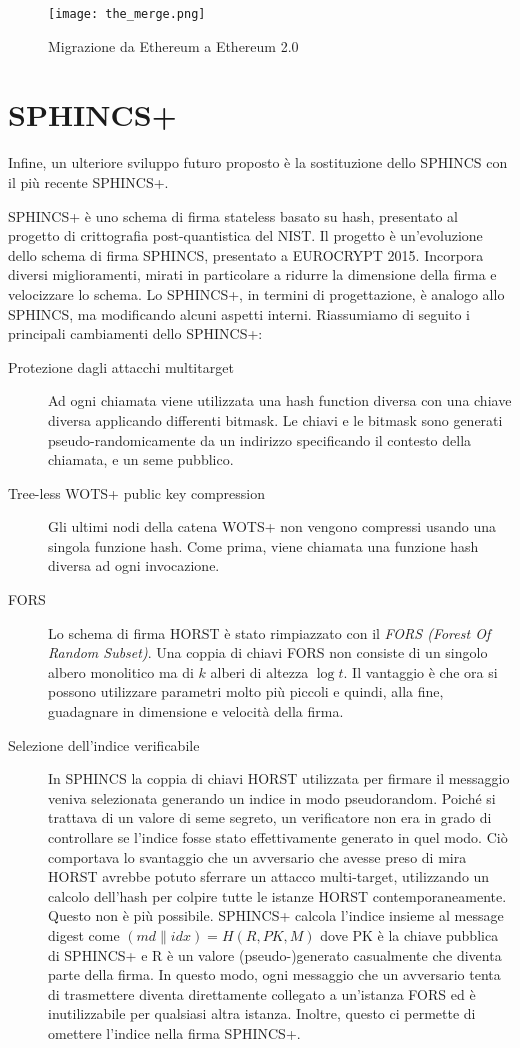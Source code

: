 \begin{figure}[h]
  \centering
  \texttt{[image: the\_merge.png]}
  \caption{Migrazione da Ethereum a Ethereum 2.0}
  \label{fig:the_merge}
\end{figure}

\section{SPHINCS+}
Infine, un ulteriore sviluppo futuro proposto è la sostituzione dello SPHINCS con il più recente SPHINCS+.

SPHINCS+ è uno schema di firma stateless basato su hash, presentato al progetto di crittografia post-quantistica del NIST. Il progetto è un'evoluzione dello schema di firma SPHINCS, presentato a EUROCRYPT 2015. Incorpora diversi miglioramenti, mirati in particolare a ridurre la dimensione della firma e velocizzare lo schema. Lo SPHINCS+, in termini di progettazione, è analogo allo SPHINCS, ma modificando alcuni aspetti interni. Riassumiamo di seguito i principali cambiamenti dello SPHINCS+:
\begin{description}
  \item[Protezione dagli attacchi multitarget] Ad ogni chiamata viene utilizzata una hash function diversa con una chiave diversa applicando differenti bitmask. Le chiavi e le bitmask sono generati pseudo-randomicamente da un indirizzo specificando il contesto della chiamata, e un seme pubblico.
  \item[Tree-less WOTS+ public key compression] Gli ultimi nodi della catena WOTS+ non vengono compressi usando una singola funzione hash. Come prima, viene chiamata una funzione hash diversa ad ogni invocazione.
  \item[FORS] Lo schema di firma HORST è stato rimpiazzato con il \textit{FORS (Forest Of Random Subset)}. Una coppia di chiavi FORS non consiste di un singolo albero monolitico ma di \(k\) alberi di altezza \(\log t\). Il vantaggio è che ora si possono utilizzare parametri molto più piccoli e quindi, alla fine, guadagnare in dimensione e velocità della firma.
  \item[Selezione dell'indice verificabile] In SPHINCS la coppia di chiavi HORST utilizzata per firmare il messaggio veniva selezionata generando un indice in modo pseudorandom. Poiché si trattava di un valore di seme segreto, un verificatore non era in grado di controllare se l'indice fosse stato effettivamente generato in quel modo.  Ciò comportava lo svantaggio che un avversario che avesse preso di mira HORST avrebbe potuto sferrare un attacco multi-target, utilizzando un calcolo dell'hash per colpire tutte le istanze HORST contemporaneamente. Questo non è più possibile. SPHINCS+ calcola l'indice insieme al message digest come \(( md \| idx ) = H ( R, PK, M )\) dove PK è la chiave pubblica di SPHINCS+ e R è un valore (pseudo-)generato casualmente che diventa parte della firma. In questo modo, ogni messaggio che un avversario tenta di trasmettere diventa direttamente collegato a un'istanza FORS ed è inutilizzabile per qualsiasi altra istanza. Inoltre, questo ci permette di omettere l'indice nella firma SPHINCS+.
\end{description}